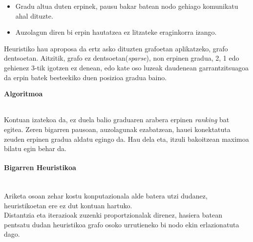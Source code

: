 \documentclass[eu,gi]{ifirak}\usepackage[]{graphicx}\usepackage[]{color}
\begin{document}
\begin{itemize}
\item Gradu altua duten erpinek, pausu bakar batean nodo gehiago komunikatu ahal dituzte.\\

\item Auzolagun diren bi erpin hautatzea ez litzateke eraginkorra izango.
\end{itemize}

Heuristiko hau aproposa da ertz asko dituzten grafoetan aplikatzeko, grafo dentsoetan. Aitzitik, grafo ez dentsoetan(\textit{sparse}), non erpinen gradua, 2, 1 edo gehienez 3-tik igotzen ez denean, edo kate oso luzeak daudenean garrantzitsuagoa da erpin batek besteekiko duen posizioa gradua baino.

\vspace*{0.5cm}
\textbf{Algoritmoa}\\
\\
\vspace*{0.5cm}

Kontuan izatekoa da, ez duela balio graduaren arabera erpinen \textit{ranking} bat egitea. Zeren bigarren pausoan, auzolagunak ezabatzean, hauei konektatuta zeuden erpinen gradua aldatu egingo da. Hau dela eta, itzuli bakoitzean maximoa bilatu egin behar da.\\

\paragraph{Bigarren Heuristikoa}\\
	Ariketa osoan zehar kostu konputazionala alde batera utzi dudanez, heuristikoetan ere ez dut kontuan hartuko.\\
 
Distantzia eta iterazioak zuzenki proportzionalak direnez, hasiera batean pentsatu dudan heuristikoa grafo osoko urrutieneko bi nodo ekin erlazionatuta dago.\\
\end{document}
